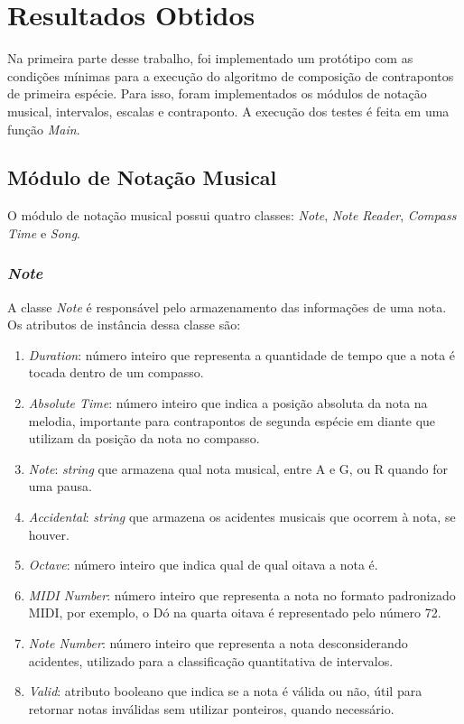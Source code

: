 \chapter[Resultados Obtidos]{Resultados Obtidos} \label{c3}

  Na primeira parte desse trabalho, foi implementado um protótipo com as condições mínimas para a execução do algoritmo de composição de contrapontos de primeira espécie. Para isso, foram implementados os módulos de notação musical, intervalos, escalas e contraponto. A execução dos testes é feita em uma função \textit{Main}.

  \section[Módulo de Notação Musical]{Módulo de Notação Musical}

    O módulo de notação musical possui quatro classes: \textit{Note}, \textit{Note Reader}, \textit{Compass Time} e \textit{Song}.

    \subsection[\textit{Note}]{\textit{Note}}

      A classe \textit{Note} é responsável pelo armazenamento das informações de uma nota. Os atributos de instância dessa classe são:

      \begin{enumerate}
        \item \textit{Duration}: número inteiro que representa a quantidade de tempo que a nota é tocada dentro de um compasso.
        \item \textit{Absolute Time}: número inteiro que indica a posição absoluta da nota na melodia, importante para contrapontos de segunda espécie em diante que utilizam da posição da nota no compasso.
        \item \textit{Note}: \textit{string} que armazena qual nota musical, entre A e G, ou R quando for uma pausa.
        \item \textit{Accidental}: \textit{string} que armazena os acidentes musicais que ocorrem à nota, se houver.
        \item \textit{Octave}: número inteiro que indica qual de qual oitava a nota é.
        \item \textit{MIDI Number}: número inteiro que representa a nota no formato padronizado MIDI, por exemplo, o Dó na quarta oitava é representado pelo número 72.
        \item \textit{Note Number}: número inteiro que representa a nota desconsiderando acidentes, utilizado para a classificação quantitativa de intervalos.
        \item \textit{Valid}: atributo booleano que indica se a nota é válida ou não, útil para retornar notas inválidas sem utilizar ponteiros, quando necessário.
      \end{enumerate}

